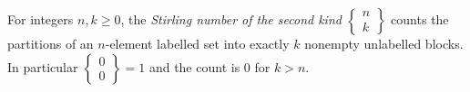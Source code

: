 
For integers $n,k\ge0$, the \emph{Stirling number of the second kind} $\left\{\begin{smallmatrix}n\\k\end{smallmatrix}\right\}$ counts the partitions of an $n$-element labelled set into exactly $k$ nonempty unlabelled blocks. In particular $\left\{\begin{smallmatrix}0\\0\end{smallmatrix}\right\}=1$ and the count is $0$ for $k>n$.
